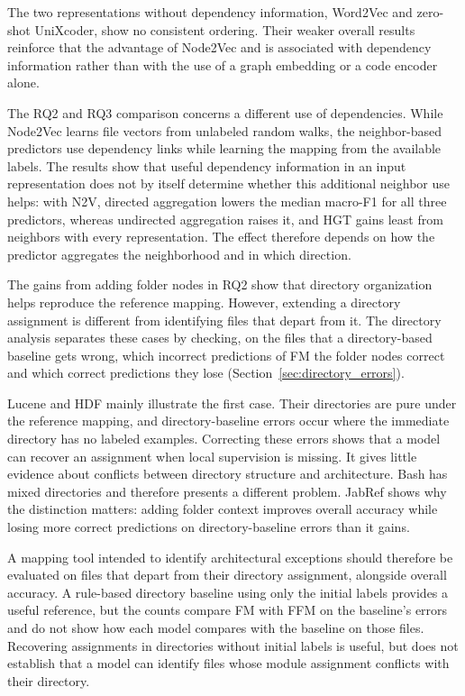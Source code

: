 The two representations without dependency information, Word2Vec and zero-shot UniXcoder, show no consistent ordering. Their weaker overall results reinforce that the advantage of Node2Vec and \ft{} is associated with dependency information rather than with the use of a graph embedding or a code encoder alone.

The RQ2 and RQ3 comparison concerns a different use of dependencies. While Node2Vec learns file vectors from unlabeled random walks, the neighbor-based predictors use dependency links while learning the mapping from the available labels. The results show that useful dependency information in an input representation does not by itself determine whether this additional neighbor use helps: with N2V, directed aggregation lowers the median macro-F1 for all three predictors, whereas undirected aggregation raises it, and HGT gains least from neighbors with every representation. The effect therefore depends on how the predictor aggregates the neighborhood and in which direction.

The gains from adding folder nodes in RQ2 show that directory organization helps reproduce the reference mapping. However, extending a directory assignment is different from identifying files that depart from it. The directory analysis separates these cases by checking, on the files that a directory-based baseline gets wrong, which incorrect predictions of FM the folder nodes correct and which correct predictions they lose (Section~\ref{sec:directory_errors}).

Lucene and HDF mainly illustrate the first case. Their directories are pure under the reference mapping, and directory-baseline errors occur where the immediate directory has no labeled examples. Correcting these errors shows that a model can recover an assignment when local supervision is missing. It gives little evidence about conflicts between directory structure and architecture. Bash has mixed directories and therefore presents a different problem. JabRef shows why the distinction matters: adding folder context improves overall accuracy while losing more correct predictions on directory-baseline errors than it gains.

A mapping tool intended to identify architectural exceptions should therefore be evaluated on files that depart from their directory assignment, alongside overall accuracy. A rule-based directory baseline using only the initial labels provides a useful reference, but the counts compare FM with FFM on the baseline's errors and do not show how each model compares with the baseline on those files. Recovering assignments in directories without initial labels is useful, but does not establish that a model can identify files whose module assignment conflicts with their directory.

